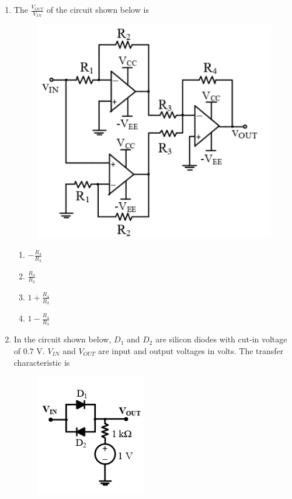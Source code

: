 \documentclass[a4paper, 11pt]{article}
\begin{document}
\begin{enumerate}
    \item The $\frac{V_{OUT}}{V_{IN}}$ of the circuit shown below is
    \begin{figure}[H]
        \centering
        \includegraphics[width=0.7\columnwidth]{figs/Q29.png}
        \caption*{}
        \label{fig:q39}
    \end{figure}
    \begin{enumerate}
        \item $-\frac{R_4}{R_3}$
        \item $\frac{R_4}{R_3}$
        \item $1 + \frac{R_4}{R_3}$
        \item $1 - \frac{R_4}{R_3}$
    \end{enumerate}

    \hfill{}
    
    \item In the circuit shown below, $D_1$ and $D_2$ are silicon diodes with cut-in voltage of $0.7$ V. $V_{IN}$ and $V_{OUT}$ are input and output voltages in volts. The transfer characteristic is
    \begin{figure}[H]
        \centering
        \includegraphics[width=0.4\columnwidth]{figs/Q30.png}
        \caption*{}
        \label{fig:q40}
    \end{figure}
    

\end{enumerate}
\end{document}
